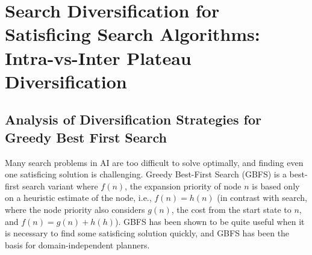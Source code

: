 
\chapter[Intra-vs-Inter Plateau Diversification]{Search Diversification for Satisficing Search Algorithms: Intra-vs-Inter Plateau Diversification}




\section{Analysis of Diversification Strategies for Greedy Best First Search}

Many search problems in AI are too difficult to solve optimally, and finding even one satisficing solution is challenging. 
Greedy Best-First Search (GBFS) is a best-first search variant where $f(n)$, the expansion priority of node $n$ is based only on a heuristic estimate of the node, i.e., $f(n) = h(n)$  (in contrast with \astar search, where the node priority also considers $g(n)$, the cost from the start state to $n$, and $f(n) = g(n)+h(h)$).
GBFS has been shown to be quite useful when it is necessary to find some  satisficing solution quickly, and GBFS 
has been the basis for \lsota domain-independent planners. %


